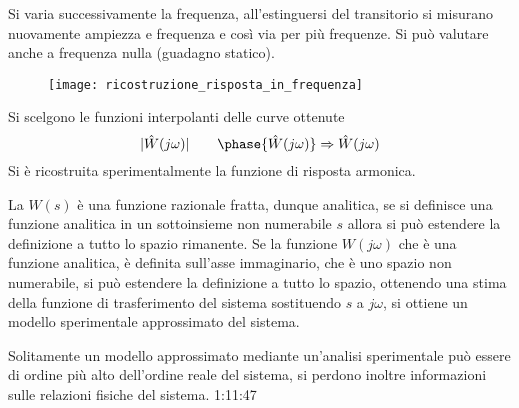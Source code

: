 Si varia successivamente la frequenza, all'estinguersi del transitorio si
misurano nuovamente ampiezza e frequenza e così via per più frequenze.
Si può valutare anche a frequenza nulla (guadagno statico).
\begin{figure}[h]
 \centering
 \texttt{[image: ricostruzione\_risposta\_in\_frequenza]}
\end{figure}

Si scelgono le funzioni interpolanti delle curve ottenute
$$
|\hat{W}(j\omega)| \qquad \phase{\hat{W}(j\omega)} \Rightarrow \hat{W}(j\omega)
$$
Si è ricostruita sperimentalmente la funzione di risposta armonica.

La $W(s)$ è una funzione razionale fratta, dunque analitica, se si definisce
una funzione analitica in un sottoinsieme non numerabile $s$ allora si può
estendere la definizione a tutto lo spazio rimanente.
Se la funzione $W(j\omega)$ che è una funzione analitica, è definita sull'asse
immaginario, che è uno spazio non numerabile, si può estendere la definizione a
tutto lo spazio, ottenendo una stima della funzione di trasferimento del
sistema sostituendo $s$ a $j\omega$, si ottiene un modello sperimentale
approssimato del sistema.

Solitamente un modello approssimato mediante un'analisi sperimentale può
essere di ordine più alto dell'ordine reale del sistema, si perdono inoltre
informazioni sulle relazioni fisiche del sistema.
1:11:47
